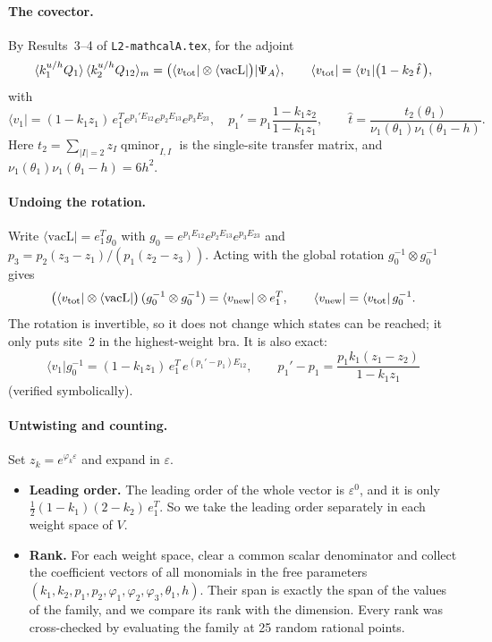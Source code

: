 \documentclass[11pt]{article}
\newcommand{\vacL}{\langle\mathrm{vacL}|}
\newcommand{\nb}[1]{\texttt{#1}}
\theoremstyle{definition}
\theoremstyle{remark}
\begin{document}
\paragraph{The covector.}
By Results~3--4 of \nb{L2-mathcalA.tex}, for the adjoint
\begin{equation}
\langle k_1^{u/h}Q_1\rangle\,\langle k_2^{u/h}Q_{12}\rangle_m=\big(\langle v_{\rm tot}|\otimes\vacL\big)|\Psi_A\rangle,\qquad
\langle v_{\rm tot}|=\langle v_1|\big(1-k_2\,\hat t\,\big),
\end{equation}
with
\begin{equation}
\langle v_1|=(1-k_1z_1)\,e_1^Te^{p_1'E_{12}}e^{p_2E_{13}}e^{p_3E_{23}},\quad p_1'=p_1\frac{1-k_1z_2}{1-k_1z_1},\qquad
\hat t=\frac{t_2(\theta_1)}{\nu_1(\theta_1)\nu_1(\theta_1-h)} .
\end{equation}
Here $t_2=\sum_{|I|=2}z_I\operatorname{qminor}_{I,I}$ is the single-site transfer matrix, and $\nu_1(\theta_1)\nu_1(\theta_1-h)=6h^2$.

\paragraph{Undoing the rotation.}
Write $\vacL=e_1^Tg_0$ with $g_0=e^{p_1E_{12}}e^{p_2E_{13}}e^{p_3E_{23}}$ and $p_3=p_2(z_3-z_1)/(p_1(z_2-z_3))$. Acting with the global rotation $g_0^{-1}\otimes g_0^{-1}$ gives
\begin{equation}
\big(\langle v_{\rm tot}|\otimes\vacL\big)\,(g_0^{-1}\otimes g_0^{-1})=\langle v_{\rm new}|\otimes e_1^T,\qquad \langle v_{\rm new}|=\langle v_{\rm tot}|\,g_0^{-1}.
\end{equation}
The rotation is invertible, so it does not change which states can be reached; it only puts site~2 in the highest-weight bra. It is also exact:
\begin{equation}\label{eq:v1g}
\langle v_1|g_0^{-1}=(1-k_1z_1)\,e_1^T\,e^{(p_1'-p_1)E_{12}},\qquad p_1'-p_1=\frac{p_1k_1(z_1-z_2)}{1-k_1z_1}
\end{equation}
(verified symbolically).

\paragraph{Untwisting and counting.}
Set $z_k=e^{\varphi_k\varepsilon}$ and expand in $\varepsilon$.
\begin{itemize}
\item \textbf{Leading order.} The leading order of the whole vector is $\varepsilon^0$, and it is only $\tfrac12(1-k_1)(2-k_2)\,e_1^T$. So we take the leading order separately in each weight space of $V$.
\item \textbf{Rank.} For each weight space, clear a common scalar denominator and collect the coefficient vectors of all monomials in the free parameters $(k_1,k_2,p_1,p_2,\varphi_1,\varphi_2,\varphi_3,\theta_1,h)$. Their span is exactly the span of the values of the family, and we compare its rank with the dimension. Every rank was cross-checked by evaluating the family at 25 random rational points.
\end{itemize}
\end{document}
